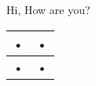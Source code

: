 \documentclass[10pt,a4paper]{article}
\begin{document}
Hi, How are you?\\

\begin{tabular}{|c|c|}
\hline 
• & • \\ 
\hline 
• & • \\ 
\hline 
\end{tabular} 
\end{document}
